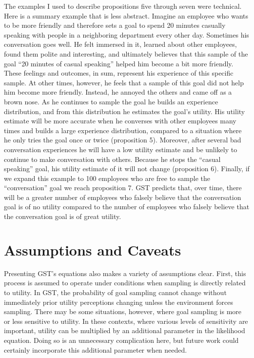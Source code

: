 \documentclass[english,,man]{apa6}
\theoremstyle{definition}
\theoremstyle{definition}
\theoremstyle{definition}
\theoremstyle{remark}
\begin{document}
The examples I used to describe propositions five through seven were
technical. Here is a summary example that is less abstract. Imagine an
employee who wants to be more friendly and therefore sets a goal to
spend 20 minutes casually speaking with people in a neighboring
department every other day. Sometimes his conversation goes well. He
felt immersed in it, learned about other employees, found them polite
and interesting, and ultimately believes that this sample of the goal
\enquote{20 minutes of casual speaking} helped him become a bit more
friendly. These feelings and outcomes, in sum, represent his experience
of this specific sample. At other times, however, he feels that a sample
of this goal did not help him become more friendly. Instead, he annoyed
the others and came off as a brown nose. As he continues to sample the
goal he builds an experience distribution, and from this distribution he
estimates the goal's utility. His utility estimate will be more accurate
when he converses with other employees many times and builds a large
experience distribution, compared to a situation where he only tries the
goal once or twice (proposition 5). Moreover, after several bad
conversation experiences he will have a low utility estimate and be
unlikely to continue to make conversation with others. Because he stops
the \enquote{casual speaking} goal, his utility estimate of it will not
change (proposition 6). Finally, if we expand this example to 100
employees who are free to sample the \enquote{conversation} goal we
reach proposition 7. GST predicts that, over time, there will be a
greater number of employees who falsely believe that the conversation
goal is of no utility compared to the number of employees who falsely
believe that the conversation goal is of great utility.

\hypertarget{assumptions-and-caveats}{%
\section{Assumptions and Caveats}\label{assumptions-and-caveats}}

Presenting GST's equations also makes a variety of assumptions clear.
First, this process is assumed to operate under conditions when sampling
is directly related to utility. In GST, the probability of goal sampling
cannot change without immediately prior utility perceptions changing
unless the environment forces sampling. There may be some situations,
however, where goal sampling is more or less sensitive to utility. In
these contexts, where various levels of sensitivity are important,
utility can be multiplied by an additional parameter in the likelihood
equation. Doing so is an unnecessary complication here, but future work
could certainly incorporate this additional parameter when needed.
\end{document}
